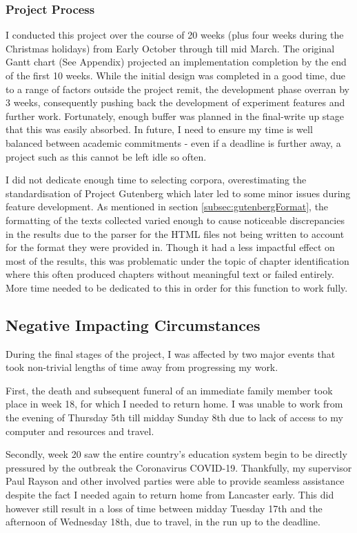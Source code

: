 \documentclass{article}
\begin{document}
{        \subsubsection{Project Process}
            I conducted this project over the course of 20 weeks (plus four weeks during the Christmas holidays) from Early October through till mid March. The original Gantt chart (See Appendix) projected an implementation completion by the end of the first 10 weeks. While the initial design was completed in a good time, due to a range of factors outside the project remit, the development phase overran by 3 weeks, consequently pushing back the development of experiment features and further work. Fortunately, enough buffer was planned in the final-write up stage that this was easily absorbed. In future, I need to ensure my time is well balanced between academic commitments - even if a deadline is further away, a project such as this cannot be left idle so often.

            I did not dedicate enough time to selecting corpora, overestimating the standardisation of Project Gutenberg which later led to some minor issues during feature development. As mentioned in section \ref{subsec:gutenbergFormat}, the formatting of the texts collected varied enough to cause noticeable discrepancies in the results due to the parser for the HTML files not being written to account for the format they were provided in. Though it had a less impactful effect on most of the results, this was problematic under the topic of chapter identification where this often produced chapters without meaningful text or failed entirely. More time needed to be dedicated to this in order for this function to work fully.
    \subsection{Negative Impacting Circumstances}
        During the final stages of the project, I was affected by two major events that took non-trivial lengths of time away from progressing my work.

        First, the death and subsequent funeral of an immediate family member took place in week 18, for which I needed to return home. I was unable to work from the evening of Thursday 5th till midday Sunday 8th due to lack of access to my computer and resources and travel.

        Secondly, week 20 saw the entire country's education system begin to be directly pressured by the outbreak the Coronavirus COVID-19. Thankfully, my supervisor Paul Rayson and other involved parties were able to provide seamless assistance despite the fact I needed again to return home from Lancaster early. This did however still result in a loss of time between midday Tuesday 17th and the afternoon of Wednesday 18th, due to travel, in the run up to the deadline.
}
\end{document}
